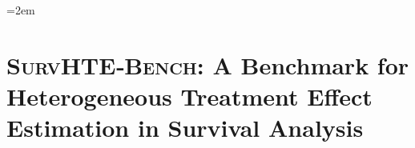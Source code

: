 \begingroup
\ChFourBegin
\emergencystretch=2em
\chapter{\textsc{SurvHTE‐Bench}: A Benchmark for Heterogeneous Treatment Effect Estimation in Survival Analysis}\label{chap:ch04}

% 








% 
% 
% 

\clearpage
\endgroup
